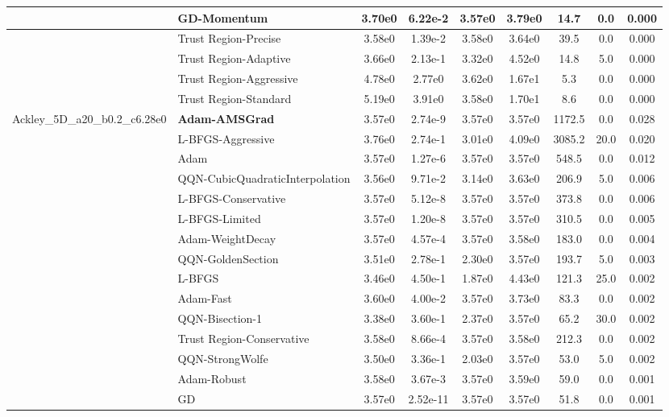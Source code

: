 \documentclass{article}
\begin{document}
\begin{longtable}{|l|l|c|c|c|c|c|c|c|}
\hline
 & GD-Momentum & 3.70e0 & 6.22e-2 & 3.57e0 & 3.79e0 & 14.7 & 0.0 & 0.000 \\
\hline
 & Trust Region-Precise & 3.58e0 & 1.39e-2 & 3.58e0 & 3.64e0 & 39.5 & 0.0 & 0.000 \\
\hline
 & Trust Region-Adaptive & 3.66e0 & 2.13e-1 & 3.32e0 & 4.52e0 & 14.8 & 5.0 & 0.000 \\
\hline
 & Trust Region-Aggressive & 4.78e0 & 2.77e0 & 3.62e0 & 1.67e1 & 5.3 & 0.0 & 0.000 \\
\hline
 & Trust Region-Standard & 5.19e0 & 3.91e0 & 3.58e0 & 1.70e1 & 8.6 & 0.0 & 0.000 \\
Ackley\_5D\_a20\_b0.2\_c6.28e0 & \textbf{Adam-AMSGrad} & 3.57e0 & 2.74e-9 & 3.57e0 & 3.57e0 & 1172.5 & 0.0 & 0.028 \\
\hline
 & L-BFGS-Aggressive & 3.76e0 & 2.74e-1 & 3.01e0 & 4.09e0 & 3085.2 & 20.0 & 0.020 \\
\hline
 & Adam & 3.57e0 & 1.27e-6 & 3.57e0 & 3.57e0 & 548.5 & 0.0 & 0.012 \\
\hline
 & QQN-CubicQuadraticInterpolation & 3.56e0 & 9.71e-2 & 3.14e0 & 3.63e0 & 206.9 & 5.0 & 0.006 \\
\hline
 & L-BFGS-Conservative & 3.57e0 & 5.12e-8 & 3.57e0 & 3.57e0 & 373.8 & 0.0 & 0.006 \\
\hline
 & L-BFGS-Limited & 3.57e0 & 1.20e-8 & 3.57e0 & 3.57e0 & 310.5 & 0.0 & 0.005 \\
\hline
 & Adam-WeightDecay & 3.57e0 & 4.57e-4 & 3.57e0 & 3.58e0 & 183.0 & 0.0 & 0.004 \\
\hline
 & QQN-GoldenSection & 3.51e0 & 2.78e-1 & 2.30e0 & 3.57e0 & 193.7 & 5.0 & 0.003 \\
\hline
 & L-BFGS & 3.46e0 & 4.50e-1 & 1.87e0 & 4.43e0 & 121.3 & 25.0 & 0.002 \\
\hline
 & Adam-Fast & 3.60e0 & 4.00e-2 & 3.57e0 & 3.73e0 & 83.3 & 0.0 & 0.002 \\
\hline
 & QQN-Bisection-1 & 3.38e0 & 3.60e-1 & 2.37e0 & 3.57e0 & 65.2 & 30.0 & 0.002 \\
\hline
 & Trust Region-Conservative & 3.58e0 & 8.66e-4 & 3.57e0 & 3.58e0 & 212.3 & 0.0 & 0.002 \\
\hline
 & QQN-StrongWolfe & 3.50e0 & 3.36e-1 & 2.03e0 & 3.57e0 & 53.0 & 5.0 & 0.002 \\
\hline
 & Adam-Robust & 3.58e0 & 3.67e-3 & 3.57e0 & 3.59e0 & 59.0 & 0.0 & 0.001 \\
\hline
 & GD & 3.57e0 & 2.52e-11 & 3.57e0 & 3.57e0 & 51.8 & 0.0 & 0.001 \\
\hline

\end{longtable}
\end{document}
